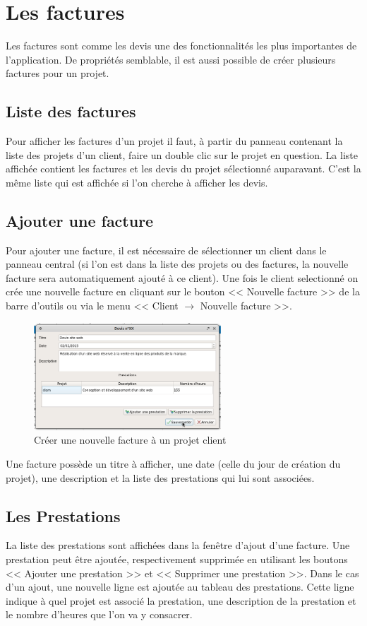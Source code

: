 \chapter{Les factures}
Les factures sont comme les devis une des fonctionnalités les plus importantes de l'application. De propriétés semblable, il est aussi possible de créer plusieurs factures pour un projet.
\section{Liste des factures}
Pour afficher les factures d'un projet il faut, à partir du panneau contenant la liste des projets d'un client, faire un double clic sur le projet en question. La liste affichée contient les factures et les devis du projet sélectionné auparavant. C'est la même liste qui est affichée si l'on cherche à afficher les devis.

\section{Ajouter une facture}
Pour ajouter une facture, il est nécessaire de sélectionner un client dans le panneau central (si l'on est dans la liste des projets ou des factures, la nouvelle facture sera automatiquement ajouté à ce client). Une fois le client selectionné on crée une nouvelle facture en cliquant sur le bouton << Nouvelle facture >> de la barre d'outils ou via le menu << Client $\rightarrow$ Nouvelle facture >>. 
\begin{figure}[H]
	\centering
	\includegraphics[width=7cm]{screens/creerDevis.png}
	\caption{Créer une nouvelle facture à un projet client}
\end{figure}
Une facture possède un titre à afficher, une date (celle du jour de création du projet), une description et la liste des prestations qui lui sont associées. 
\section{Les Prestations}
La liste des prestations sont affichées dans la fenêtre d'ajout d'une facture. Une prestation peut être ajoutée, respectivement supprimée en utilisant les boutons << Ajouter une prestation >> et << Supprimer une prestation >>. Dans le cas d'un ajout, une nouvelle ligne est ajoutée au tableau des prestations. Cette ligne indique à quel projet est associé la prestation, une description de la prestation et le nombre d'heures que l'on va y consacrer. 